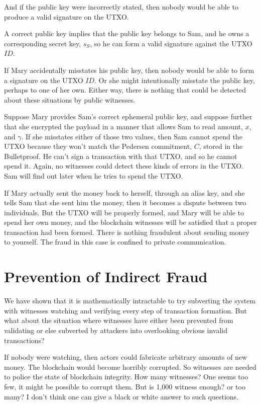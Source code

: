 \documentclass[a4paper, 10pt, conference]{ieeeconf}
\begin{document}
And if the public key were incorrectly stated, then nobody would be able to produce a valid signature on the UTXO. 

A correct public key implies that the public key belongs to Sam, and he owns a corresponding secret key, $s_S$, so he can form a valid signature against the UTXO $\mathit{ID}$.

If Mary accidentally misstates his public key, then nobody would be able to form a signature on the UTXO $\mathit{ID}$. Or she might intentionally misstate the public key, perhaps to one of her own. Either way, there is nothing that could be detected about these situations by public witnesses. 

Suppose Mary provides Sam's correct ephemeral public key, and suppose further that she encrypted the payload in a manner that allows Sam to read amount, $x$, and $\gamma$. If she misstates either of those two values, then Sam cannot spend the UTXO because they won't match the Pedersen commitment, $C$, stored in the Bulletproof. He can't sign a transaction with that UTXO, and so he cannot spend it. Again, no witnesses could detect these kinds of errors in the UTXO. Sam will find out later when he tries to spend the UTXO.

If Mary actually sent the money back to herself, through an alias key, and she tells Sam that she sent him the money, then it becomes a dispute between two individuals. But the UTXO will be properly formed, and Mary will be able to spend her own money, and the blockchain witnesses will be satisfied that a proper transaction had been formed. There is nothing fraudulent about sending money to yourself. The fraud in this case is confined to private communication.

\section{Prevention of Indirect Fraud}
We have shown that it is mathematically intractable to try subverting the system with witnesses watching and verifying every step of transaction formation. But what about the situation where witnesses have either been prevented from validating or else subverted by attackers into overlooking obvious invalid transactions?

If nobody were watching, then actors could fabricate arbitrary amounts of new money. The blockchain would become horribly corrupted. So witnesses are needed to police the state of blockchain integrity. How many witnesses? One seems too few, it might be possible to corrupt them. But is 1,000 witness enough? or too many? I don't think one can give a black or white answer to such questions.
\end{document}
